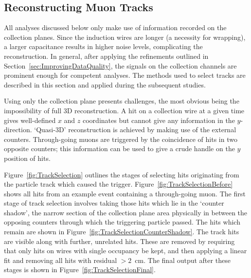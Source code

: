 \subsection{Reconstructing Muon Tracks}\label{sec:ReconstructingMuonTracks}

All analyses discussed below only make use of information recorded on the collection planes.  Since the induction wires are longer (a necessity for wrapping), a larger capacitance results in higher noise levels, complicating the reconstruction.  In general, after applying the refinements outlined in Section~\ref{sec:ImprovingDataQuality}, the signals on the collection channels are prominent enough for competent analyses.  The methods used to select tracks are described in this section and applied during the subsequent studies.

Using only the collection plane presents challenges, the most obvious being the impossibility of full 3D reconstruction.  A hit on a collection wire at a given time gives well-defined $x$ and $z$ coordinates but cannot give any information in the $y$-direction.  `Quasi-3D' reconstruction is achieved by making use of the external counters.  Through-going muons are triggered by the coincidence of hits in two opposite counters; this information can be used to give a crude handle on the $y$ position of hits.

Figure~\ref{fig:TrackSelection} outlines the stages of selecting hits originating from the particle track which caused the trigger.  Figure~\ref{fig:TrackSelectionBefore} shows all hits from an example event containing a through-going muon.  The first stage of track selection involves taking those hits which lie in the `counter shadow', the narrow section of the collection plane area physically in between the opposing counters through which the triggering particle passed.  The hits which remain are shown in Figure~\ref{fig:TrackSelectionCounterShadow}.  The track hits are visible along with further, unrelated hits.  These are removed by requiring that only hits on wires with single occupancy be kept, and then applying a linear fit and removing all hits with residual $>2$~cm.  The final output after these stages is shown in Figure~\ref{fig:TrackSelectionFinal}.

